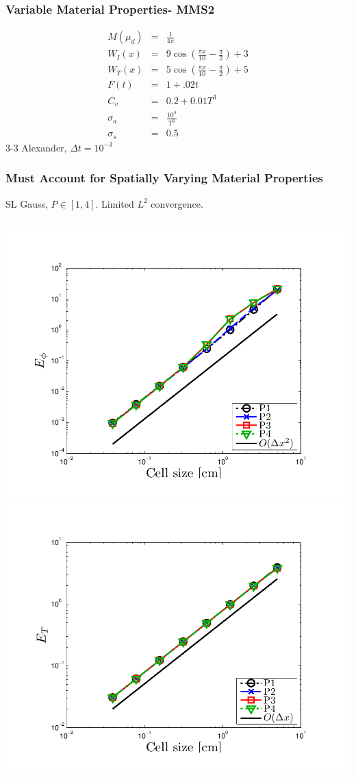 \documentclass{beamer}
\newcommand{\bea}{\begin{eqnarray*}}  %
\newcommand{\eea}{\end{eqnarray*}}
\begin{document}
\begin{frame}
\frametitle{Variable Material Properties- MMS2}
\bea
M(\mu_d) &=& \frac{1}{4\pi} \\
W_I(x) &=& 9 \cos\left( \frac{\pi x}{10} - \frac{\pi}{2} \right) + 3  \\
W_T(x) &=&  5 \cos\left( \frac{\pi x}{10} - \frac{\pi}{2} \right) + 5 \\
F(t) &=&  1 + .02t \\
C_v &=& 0.2 + 0.01 T^3 \\
\sigma_a &=& \frac{10^4}{T^3} \\
\sigma_s &=& 0.5 
\eea
3-3 Alexander, $\Delta t = 10^{-3}$
\end{frame}

\begin{frame}
\frametitle{Must Account for Spatially Varying Material Properties}
SL Gauss, $P\in[1,4]$.  Limited $L^2$ convergence.
\begin{columns}[t]
\centering
\includegraphics[width=\textwidth,trim=0.25in  0.2in 0.75in 0.5in,clip=true]{../chapter6_grey_radtran/Dissertation_Data/MMS3_Constant_XS_SL_Gauss_phi_L2.pdf}
\centering
\includegraphics[width=\textwidth,trim=0.25in  0.2in 0.75in 0.5in,clip=true]{../chapter6_grey_radtran/Dissertation_Data/MMS3_Constant_XS_SL_Gauss_temp_L2.pdf}

\end{columns}
\end{frame}
\end{document}
